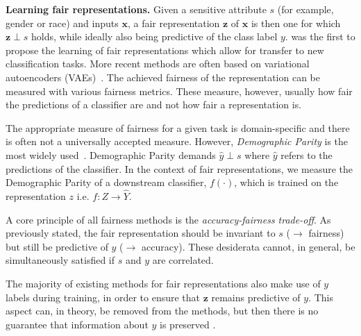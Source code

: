 \textbf{Learning fair representations.}
Given a sensitive attribute $s$ (for example, gender or race) and inputs $\bm{x}$,
a fair representation $\bm{z}$ of $\bm{x}$ is then one for which $\bm{z} \perp s$ holds,
while ideally also being predictive of the class label $y$.
\cite{ZemWuSwePitetal13} was the first to propose the learning of fair representations which allow for transfer to new classification tasks.
More recent methods are often based on variational autoencoders (VAEs)~\cite{kingma2013auto,LouSweLi15,edwardsstorkey,beutel}.
The achieved fairness of the representation can be measured with various fairness metrics.
These measure, however, usually how fair the predictions of a classifier are
and not how fair a representation is.

The appropriate measure of fairness for a given task is domain-specific \cite{liu2018delayed}
and there is often not a universally accepted measure.
However, \emph{Demographic Parity} is the most widely used~\cite{LouSweLi15,edwardsstorkey,beutel}.
Demographic Parity demands $\hat{y} \perp s$ where $\hat{y}$ refers to the predictions of the classifier.
In the context of fair representations, we measure the Demographic Parity of a downstream classifier, $f(\cdot )$, which is trained on the representation $z$ i.e.  $f: Z \to \hat{Y}$.

A core principle of all fairness methods is the \emph{accuracy-fairness trade-off}.
As previously stated, the fair representation should be invariant to $s$ ($\to$ fairness) but still be predictive of $y$ ($\to$ accuracy).
These desiderata cannot, in general, be simultaneously satisfied if $s$ and $y$ are correlated.


The majority of existing methods for fair representations also make use of $y$ labels during training,
in order to ensure that $\bm{z}$ remains predictive of $y$.
This aspect can, in theory, be removed from the methods,
but then there is no guarantee that information about $y$ is preserved \cite{LouSweLi15}. 

